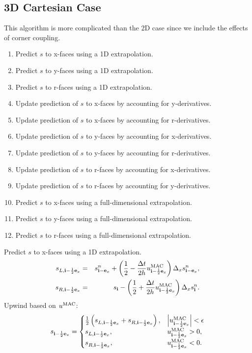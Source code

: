 \subsection{3D Cartesian Case}
This algorithm is more complicated than the 2D case since we include
the effects of corner coupling.
\begin{enumerate}
\item Predict $s$ to x-faces using a 1D extrapolation.
\item Predict $s$ to y-faces using a 1D extrapolation.
\item Predict $s$ to r-faces using a 1D extrapolation.
\item Update prediction of $s$ to x-faces by accounting for y-derivatives.
\item Update prediction of $s$ to x-faces by accounting for r-derivatives.
\item Update prediction of $s$ to y-faces by accounting for x-derivatives.
\item Update prediction of $s$ to y-faces by accounting for r-derivatives.
\item Update prediction of $s$ to r-faces by accounting for x-derivatives.
\item Update prediction of $s$ to r-faces by accounting for y-derivatives.
\item Predict $s$ to x-faces using a full-dimensional extrapolation.
\item Predict $s$ to y-faces using a full-dimensional extrapolation.
\item Predict $s$ to r-faces using a full-dimensional extrapolation.
\end{enumerate}
Predict $s$ to x-faces using a 1D extrapolation.
\begin{eqnarray}
s_{L,{\bf i}-\frac{1}{2}{\bf e}_x} &=& s_{{\bf i}-{\bf e}_x}^n + \left(\frac{1}{2} - \frac{\Delta t}{2h}u_{{\bf i}-\frac{1}{2}{\bf e}_x}^{\rm MAC}\right)\Delta_x s_{{\bf i}-{\bf e}_x}^n, \label{3D predict s to left}\\
s_{R,{\bf i}-\frac{1}{2}{\bf e}_x} &=& s_{{\bf i}} - \left(\frac{1}{2} + \frac{\Delta t}{2h}u_{{\bf i}-\frac{1}{2}{\bf e}_x}^{\rm MAC}\right)\Delta_x s_{{\bf i}}^n.\label{3D predict s to right}
\end{eqnarray}
Upwind based on $u^{\rm MAC}$:
\begin{equation}
s_{{\bf i}-\frac{1}{2}{\bf e}_x} =
\begin{cases}
\frac{1}{2}\left(s_{L,{\bf i}-\frac{1}{2}{\bf e}_x} + s_{R,{\bf i}-\frac{1}{2}{\bf e}_x}\right), & \left|u^{\rm MAC}_{{\bf i}-\frac{1}{2}{\bf e}_x}\right| < \epsilon \\
s_{L,{\bf i}-\frac{1}{2}{\bf e}_x}, & u^{\rm MAC}_{{\bf i}-\frac{1}{2}{\bf e}_x} > 0, \\
s_{R,{\bf i}-\frac{1}{2}{\bf e}_x}, & u^{\rm MAC}_{{\bf i}-\frac{1}{2}{\bf e}_x} < 0. \\
\end{cases}
\end{equation}
